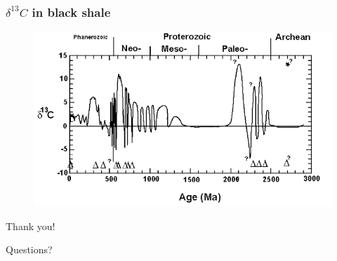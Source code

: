 \documentclass{beamer}
\begin{document}
        \begin{frame}
        \frametitle{$\delta^{13} C$ in black shale}
        \begin{figure}
        \begin{center}
                \includegraphics[width=\textwidth]{shale_carbon.png}
        \end{center}
        \end{figure}
        \end{frame}
        
        \begin{frame}[standout]
                Thank you!
                \pause

                Questions?
        \end{frame}
\end{document}
